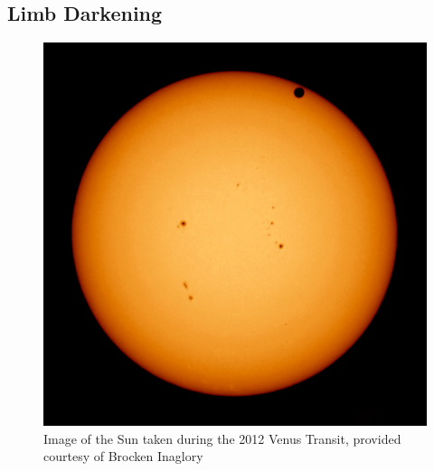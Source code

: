 \subsection{Limb Darkening}
\begin{figure}
    \centering
    \includegraphics[width=\figwidth]{images/venus_transit.jpg}
    \caption{Image of the Sun taken during the 2012 Venus Transit, provided courtesy of Brocken Inaglory}
    \label{fig:limb_darkening_image}
\end{figure}

